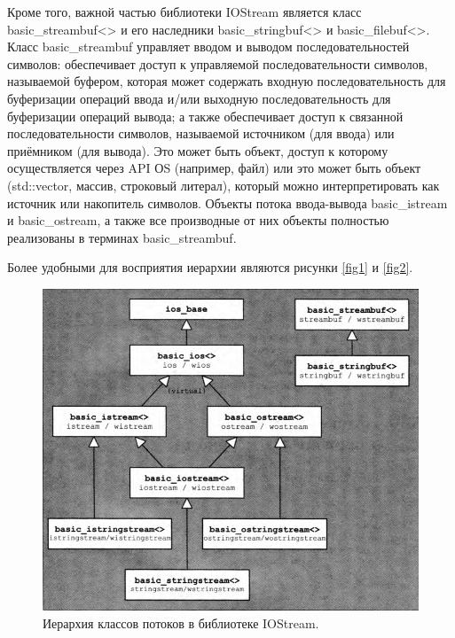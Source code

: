 \documentclass[a4paper,12pt]{article}	%
\begin{document}
	Кроме того, важной частью библиотеки IOStream является класс basic\_streambuf<> и его наследники basic\_stringbuf<> и basic\_filebuf<>. Класс basic\_streambuf управляет вводом и выводом последовательностей символов: обеспечивает доступ к управляемой последовательности символов, называемой буфером, которая может содержать входную последовательность для буферизации операций ввода и/или выходную последовательность для буферизации операций вывода; а также обеспечивает доступ к связанной последовательности символов,  называемой источником (для ввода) или приёмником (для вывода). Это может быть объект, доступ к которому осуществляется через API ОS (например, файл) или это может быть объект (std::vector, массив, строковый литерал), который можно интерпретировать как источник или накопитель символов. Объекты потока ввода-вывода basic\_istream и basic\_ostream, а также все производные от них объекты полностью реализованы в терминах basic\_streambuf.
	
	Более удобными для восприятия иерархии являются рисунки \eqref{fig1} и \eqref{fig2}.
	
	\begin{figure}[h!]
		\begin{center}
			\includegraphics[scale = 0.4]{fig1}
			\caption{Иерархия классов потоков в библиотеке IOStream.}
			\label{fig1}
		\end{center}
	\end{figure}
	
\end{document}

